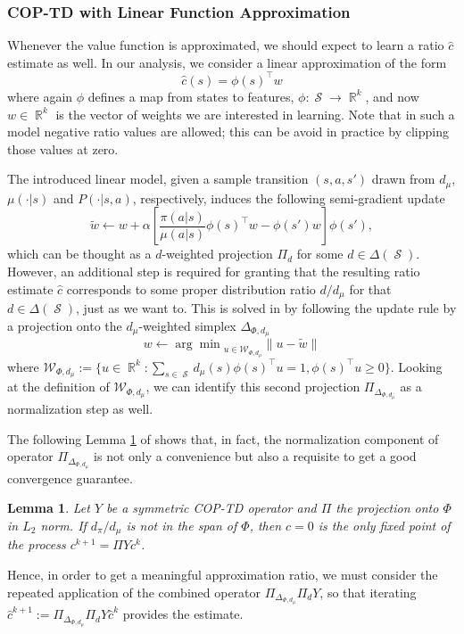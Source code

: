 \documentclass[12pt,a4paper,openright,twoside]{article}
\DeclareMathOperator*{\R}{\mathbb{R}}
\DeclareMathOperator*{\Sspace}{\mathcal{S}}
\numberwithin{equation}{section}
\newtheorem{lemma}[theorem]{Lemma}
\theoremstyle{definition}
\theoremstyle{remark}
\theoremstyle{plain}
\begin{document}
\subsubsection*{COP-TD with Linear Function Approximation}

Whenever the value function is approximated, we should expect to learn a ratio $\hat{c}$ estimate as well. In our analysis, we consider a linear approximation of the form
\begin{equation*}
	\hat{c}(s) = \phi(s)^\top w
\end{equation*}
where again $\phi$ defines a map from states to features, $\phi: \Sspace \rightarrow \R^k$, and now $w \in \R^k$ is the vector of weights we are interested in learning. Note that in such a model negative ratio values are allowed; this can be avoid in practice by clipping those values at zero.

The introduced linear model, given a sample transition $(s,a,s')$ drawn from $d_\mu$, $\mu(\cdot|s)$ and $P(\cdot|s,a)$, respectively, induces the following semi-gradient update
\begin{equation} \label{updateLinearCOPTD}
	\tilde{w} \leftarrow w + \alpha \left[ \frac{\pi(a|s)}{\mu(a|s)} \phi(s)^\top w - \phi(s') w \right] \phi(s'),
\end{equation}
which can be thought as a $d$-weighted projection $\Pi_d$ for some $d \in \Delta(\Sspace)$\cite{DCOPTD}. However, an additional step is required for granting that the resulting ratio estimate $\hat{c}$ corresponds to some proper distribution ratio $d / d_{\mu}$ for that $d \in \Delta(\Sspace)$, just as we want to. This is solved in \cite{COPTD} by following the update rule by a projection onto the $d_\mu$-weighted simplex $\Delta_{\Phi,d_\mu}$
\begin{equation}
	w \leftarrow {\arg \min}_{u\in \mathcal{W}_{\Phi,d_\mu}} \| u - \tilde{w} \|
\end{equation}
where $ \mathcal{W}_{\Phi,d_\mu} := \{ u \in \R^k : \sum_{s \in \Sspace} d_\mu(s) \phi(s)^\top u = 1, \phi(s)^\top u \geq 0 \}$. Looking at the definition of $\mathcal{W}_{\Phi,d_\mu}$, we can identify this second projection $\Pi_{\Delta_{\Phi,d_\mu}}$ as a normalization step as well.

The following Lemma \ref{normalizationLinearCOPTD} of \cite{DCOPTD} shows that, in fact, the normalization component of operator $\Pi_{\Delta_{\Phi,d_\mu}}$ is not only a convenience but also a requisite to get a good convergence guarantee. 
\begin{lemma} \label{normalizationLinearCOPTD}
	Let $Y$ be a symmetric COP-TD operator and $\Pi$ the projection onto $\Phi$ in $L_2$ norm. If $d_\pi / d_\mu$ is not in the span of $\Phi$, then $c=0$ is the only fixed point of the process $c^{k+1} = \Pi Y c^k$.
\end{lemma}
\noindent Hence, in order to get a meaningful approximation ratio, we must consider the repeated application of the combined operator $\Pi_{\Delta_{\Phi,d_\mu}} \Pi_d Y$, so that iterating $\hat{c}^{k+1} := \Pi_{\Delta_{\Phi,d_\mu}} \Pi_d Y \hat{c}^k$ provides the estimate.
\end{document}
